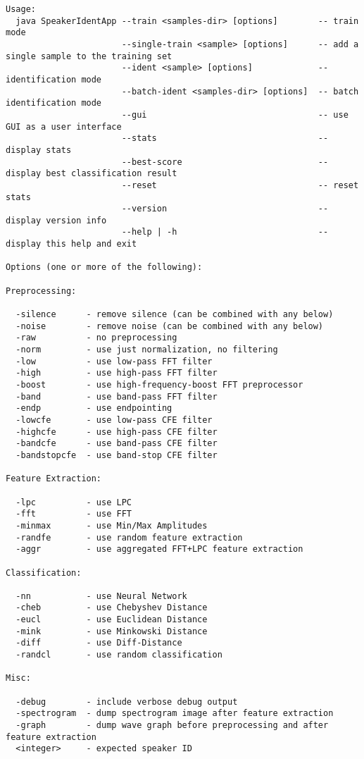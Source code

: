 \begin{verbatim}
Usage:
  java SpeakerIdentApp --train <samples-dir> [options]        -- train mode
                       --single-train <sample> [options]      -- add a single sample to the training set
                       --ident <sample> [options]             -- identification mode
                       --batch-ident <samples-dir> [options]  -- batch identification mode
                       --gui                                  -- use GUI as a user interface
                       --stats                                -- display stats
                       --best-score                           -- display best classification result
                       --reset                                -- reset stats
                       --version                              -- display version info
                       --help | -h                            -- display this help and exit

Options (one or more of the following):

Preprocessing:

  -silence      - remove silence (can be combined with any below)
  -noise        - remove noise (can be combined with any below)
  -raw          - no preprocessing
  -norm         - use just normalization, no filtering
  -low          - use low-pass FFT filter
  -high         - use high-pass FFT filter
  -boost        - use high-frequency-boost FFT preprocessor
  -band         - use band-pass FFT filter
  -endp         - use endpointing
  -lowcfe       - use low-pass CFE filter
  -highcfe      - use high-pass CFE filter
  -bandcfe      - use band-pass CFE filter
  -bandstopcfe  - use band-stop CFE filter

Feature Extraction:

  -lpc          - use LPC
  -fft          - use FFT
  -minmax       - use Min/Max Amplitudes
  -randfe       - use random feature extraction
  -aggr         - use aggregated FFT+LPC feature extraction

Classification:

  -nn           - use Neural Network
  -cheb         - use Chebyshev Distance
  -eucl         - use Euclidean Distance
  -mink         - use Minkowski Distance
  -diff         - use Diff-Distance
  -randcl       - use random classification

Misc:

  -debug        - include verbose debug output
  -spectrogram  - dump spectrogram image after feature extraction
  -graph        - dump wave graph before preprocessing and after feature extraction
  <integer>     - expected speaker ID


\end{verbatim}
